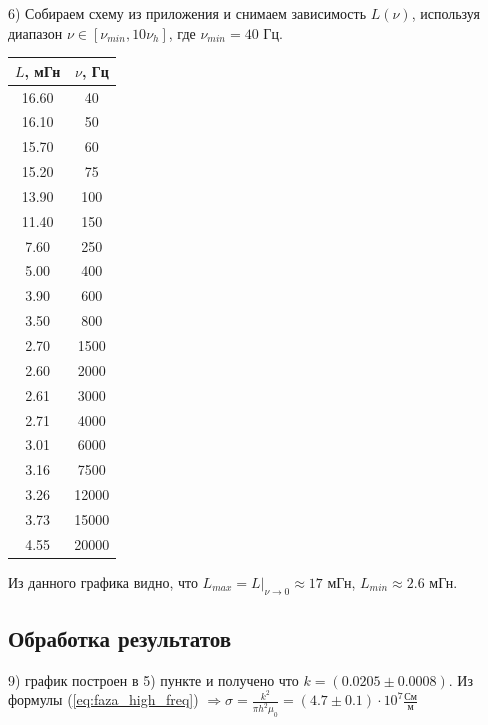 \documentclass[a4paper,12pt]{extarticle}
\begin{document}
6) Собираем схему из приложения и снимаем зависимость $L(\nu)$, используя диапазон $\nu \in [\nu_{min}, 10\nu_h]$, где $\nu_{min} = 40$ Гц. \\\begin{tabular}{|c|c|}
\hline
$L$, мГн    & $\nu$, Гц    \\ \hline
16.60 & 40    \\ \hline
16.10 & 50    \\ \hline
15.70 & 60    \\ \hline
15.20 & 75    \\ \hline
13.90 & 100   \\ \hline
11.40 & 150   \\ \hline
7.60  & 250   \\ \hline
5.00    & 400   \\ \hline
3.90  & 600   \\ \hline
3.50  & 800   \\ \hline
2.70  & 1500  \\ \hline
2.60  & 2000  \\ \hline
2.61 & 3000  \\ \hline
2.71 & 4000  \\ \hline
3.01 & 6000  \\ \hline
3.16 & 7500  \\ \hline
3.26 & 12000 \\ \hline
3.73 & 15000 \\ \hline
4.55 & 20000 \\ \hline
\end{tabular}
\begin{minipage}{1\textwidth}
\end{minipage}

Из данного графика видно, что $L_{max} = L | _{\nu \rightarrow 0} \approx 17$ мГн, $L_{min} \approx 2.6$ мГн.

\subsection*{Обработка результатов}
9) график построен в 5) пункте и получено что $k = (0.0205\pm0.0008)$. Из формулы (\ref{eq:faza_high_freq}) $\Rightarrow \sigma = \frac{k^2}{\pi h^2 \mu_0}  = (4.7\pm0.1)\cdot 10^7 \frac{\text{См}}{\text{м}}$
\end{document}
